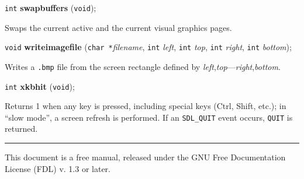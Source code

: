 \documentclass[a4paper,11pt]{article}
\newcommand{\V}{\texttt{void}}      %
\newcommand{\I}{\texttt{int}}       %
\newcommand{\C}{\texttt{char *}}    %
\newcommand{\func}[1]{\textbf{#1}}  %
\newcommand{\A}[1]{\emph{#1}}       %
\newcommand{\F}[1]{\texttt{#1}}     %
\newcommand{\T}[1]{\texttt{#1}}     %
\newenvironment{bgi}
{ %
  \begin{snugshade}
}
{ %
  \end{snugshade}
}
\begin{document}

\begin{bgi}
\I{} \func{swapbuffers} (\V{});
\end{bgi}

Swaps the current active and the current visual graphics pages.


\begin{bgi}
\V{} \func{writeimagefile} (\C{}\A{filename}, \I{} \A{left}, \I{}
\A{top}, \I{} \A{right}, \I{} \A{bottom});
\end{bgi}

Writes a \F{.bmp} file from the screen rectangle defined by
\A{left},\A{top}---\A{right},\A{bottom}.


\begin{bgi}
\I{} \func{xkbhit} (\V{});
\end{bgi}

Returns 1 when any key is pressed, including special keys (Ctrl, Shift,
etc.); in ``slow mode'', a screen refresh is performed. If an
\T{SDL\_QUIT} event occurs, \T{QUIT} is returned.


\bigskip

\rule{\linewidth}{0.2pt}

This document is a free manual, released under the GNU Free
Documentation License (FDL) v. 1.3 or later.
\end{document}
